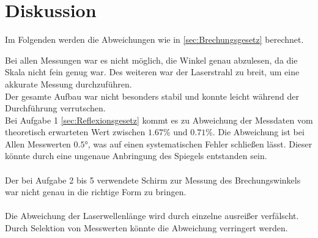\section{Diskussion}
\label{sec:Diskussion}
Im Folgenden werden die Abweichungen wie in \autoref{sec:Brechungsgesetz} berechnet.

Bei allen Messungen war es nicht möglich, die Winkel genau abzulesen, da die Skala nicht fein genug war.
Des weiteren war der Laserstrahl zu breit, um eine akkurate Messung durchzuführen.\\
Der gesamte Aufbau war nicht besonders stabil und konnte leicht während der Durchführung verrutschen.\\

Bei Aufgabe 1 \ref{sec:Reflexionsgesetz} kommt es zu Abweichung der Messdaten vom theoretisch erwarteten Wert zwischen $1.67\%$ und $0.71\%$.
Die Abweichung ist bei Allen Messwerten $0.5°$, was auf einen systematischen Fehler schließen lässt.
Dieser könnte durch eine ungenaue Anbringung des Spiegels entstanden sein.\\
\\
Der bei Aufgabe 2 bis 5 verwendete Schirm zur Messung des Brechungswinkels war nicht genau in die richtige Form zu bringen.\\
\\
Die Abweichung der Laserwellenlänge wird durch einzelne ausreißer verfälscht. 
Durch Selektion von Messwerten könnte die Abweichung verringert werden.\\
\newpage

%        
